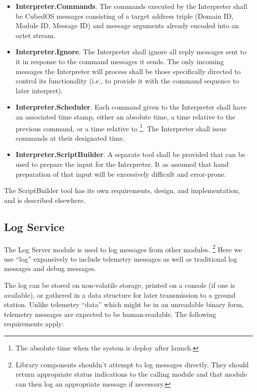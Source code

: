 \begin{itemize}
\item \textbf{Interpreter.Commands}. The commands executed by the Interpreter shall be CubedOS
  messages consisting of a target address triple (Domain ID, Module ID, Message ID) and message
  arguments already encoded into an octet stream.
\item \textbf{Interpreter.Ignore}. The Interpreter shall ignore all reply messages sent to it in
  response to the command messages it sends. The only incoming messages the Interpreter will
  process shall be those specifically directed to control its functionality (i.e., to provide it
  with the command sequence to later interpret).
\item \textbf{Interpreter.Scheduler}. Each command given to the Interpreter shall have an
  associated time stamp, either an absolute time, a time relative to the previous command, or a
  time relative to \footnote{The absolute time when the system is
    deploy after launch.}. The Interpreter shall issue commands at their designated time.
\item \textbf{Interpreter.ScriptBuilder}. A separate tool shall be provided that can be used to
  prepare the input for the Interpreter. It as assumed that hand preparation of that input will
  be excessively difficult and error-prone.
\end{itemize}

The ScriptBuilder tool has its own requirements, design, and implementation, and is described
elsewhere.

\subsection{Log Service}
\label{sec:log-service}

The Log Server module is used to log messages from other modules. \footnote{Library components
shouldn't attempt to log messages directly. They should return appropriate status indications to
the calling module and that module can then log an appropriate message if necessary.} Here we
use ``log'' expansively to include telemetry messages as well as traditional log messages and
debug messages.

The log can be stored on non-volatile storage, printed on a console (if one is available), or
gathered in a data structure for later transmission to a ground station. Unlike telemetry
``data'' which might be in an unreadable binary form, telemetry messages are expected to be
human-readable. The following requirements apply:

